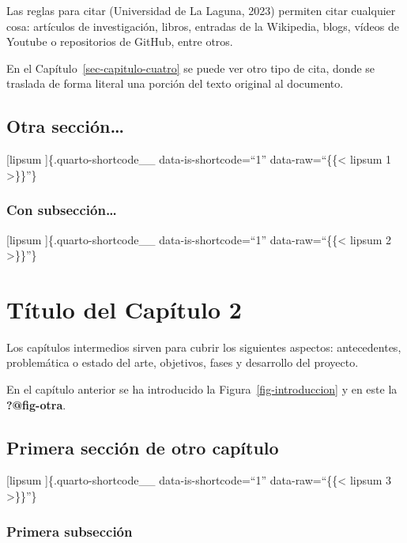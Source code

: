 \documentclass[
  letterpaper,
  DIV=11,
  numbers=noendperiod]{scrreprt}
\begin{document}
Las reglas para citar (Universidad de La Laguna, 2023) permiten citar
cualquier cosa: artículos de investigación, libros, entradas de la
Wikipedia, blogs, vídeos de Youtube o repositorios de GitHub, entre
otros.

En el Capítulo~\ref{sec-capitulo-cuatro} se puede ver otro tipo de cita,
donde se traslada de forma literal una porción del texto original al
documento.

\section{Otra sección\ldots{}}\label{otra-secciuxf3n}

\noindent [lipsum {} {]}\{.quarto-shortcode\_\_ data-is-shortcode=``1''
data-raw=``\{\{\textless{} lipsum 1 \textgreater\}\}''\}

\subsection{Con subsección\ldots{}}\label{con-subsecciuxf3n}

\noindent [lipsum {} {]}\{.quarto-shortcode\_\_ data-is-shortcode=``1''
data-raw=``\{\{\textless{} lipsum 2 \textgreater\}\}''\}


\chapter{Título del Capítulo 2}\label{sec-capitulo-dos}

\noindent Los capítulos intermedios sirven para cubrir los siguientes
aspectos: antecedentes, problemática o estado del arte, objetivos, fases
y desarrollo del proyecto.

En el capítulo anterior se ha introducido la
Figura~\ref{fig-introduccion} y en este la \textbf{?@fig-otra}.

\section{Primera sección de otro capítulo}\label{sec-primera-seccion}

\noindent [lipsum {} {]}\{.quarto-shortcode\_\_ data-is-shortcode=``1''
data-raw=``\{\{\textless{} lipsum 3 \textgreater\}\}''\}

\subsection{Primera subsección}\label{primera-subsecciuxf3n}
\end{document}
